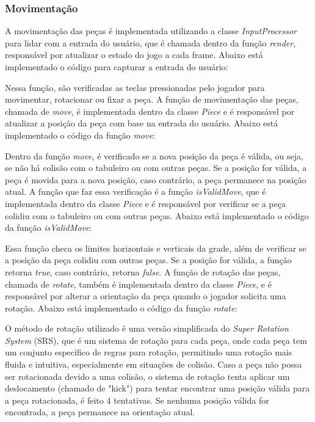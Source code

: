 \subsubsection{Movimentação}

A movimentação das peças é implementada utilizando a classe \textit{InputProcessor} para lidar com a entrada do usuário, que é chamada dentro da função \textit{render}, responsável por atualizar o estado do jogo a cada frame. Abaixo está implementado o código para capturar a entrada do usuário:



Nessa função, são verificadas as teclas pressionadas pelo jogador para movimentar, rotacionar ou fixar a peça. A função de movimentação das peças, chamada de \textit{move}, é implementada dentro da classe \textit{Piece} e é responsável por atualizar a posição da peça com base na entrada do usuário. Abaixo está implementado o código da função \textit{move}:



Dentro da função \textit{move}, é verificado se a nova posição da peça é válida, ou seja, se não há colisão com o tabuleiro ou com outras peças. Se a posição for válida, a peça é movida para a nova posição, caso contrário, a peça permanece na posição atual. A função que faz essa verificação é a função \textit{isValidMove}, que é implementada dentro da classe \textit{Piece} e é responsável por verificar se a peça colidiu com o tabuleiro ou com outras peças. Abaixo está implementado o código da função \textit{isValidMove}:



Essa função checa os limites horizontais e verticais da grade, além de verificar se a posição da peça colidiu com outras peças. Se a posição for válida, a função retorna \textit{true}, caso contrário, retorna \textit{false}.
A função de rotação das peças, chamada de \textit{rotate}, também é implementada dentro da classe \textit{Piece}, e é responsável por alterar a orientação da peça quando o jogador solicita uma rotação. Abaixo está implementado o código da função \textit{rotate}:



O método de rotação utilizado é uma versão simplificada do \textit{Super Rotation System} (SRS), que é um sistema de rotação para cada peça, onde cada peça tem um conjunto específico de regras para rotação, permitindo uma rotação mais fluida e intuitiva, especialmente em situações de colisão.
Caso a peça não possa ser rotacionada devido a uma colisão, o sistema de rotação tenta aplicar um deslocamento (chamado de "kick") para tentar encontrar uma posição válida para a peça rotacionada, é feito 4 tentativas. Se nenhuma posição válida for encontrada, a peça permanece na orientação atual.


